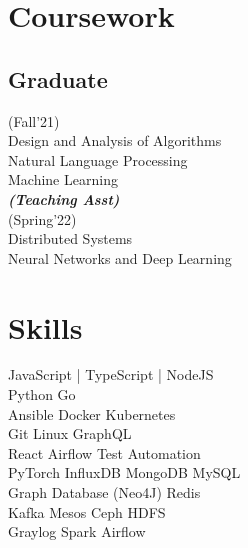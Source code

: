 \documentclass[]{deedy-resume-openfont}
\begin{document}
\begin{minipage}[t]{0.33\textwidth}
\section{Coursework}
\subsection{Graduate}
(Fall'21)\\
\textbullet{} Design and Analysis of Algorithms \\
\textbullet{} Natural Language Processing \\
\textbullet{} Machine Learning \\
{\footnotesize \textit{\textbf{(Teaching Asst) }}}
\\(Spring'22)\\
\textbullet{} Distributed Systems \\
\textbullet{} Neural Networks and Deep Learning \\
\sectionsep


\section{Skills}
\textbullet{} JavaScript | TypeScript | NodeJS \\
\textbullet{} Python \textbullet{} Go  \\

\textbullet{} Ansible \textbullet{} Docker \textbullet{} Kubernetes \\
\textbullet{} Git \textbullet{} Linux \textbullet{} GraphQL \\
\textbullet{} React \textbullet{} Airflow \textbullet{} Test Automation \\
\textbullet{} PyTorch
\textbullet{} InfluxDB \textbullet{} MongoDB \textbullet{} MySQL \\
\textbullet{} Graph Database (Neo4J) \textbullet{} Redis \\
\textbullet{} Kafka \textbullet{} Mesos \textbullet{} Ceph \textbullet{} HDFS \\
\textbullet{} Graylog \textbullet{} Spark \textbullet{} Airflow \\
\sectionsep

%
%

\end{minipage} 
\end{document}
